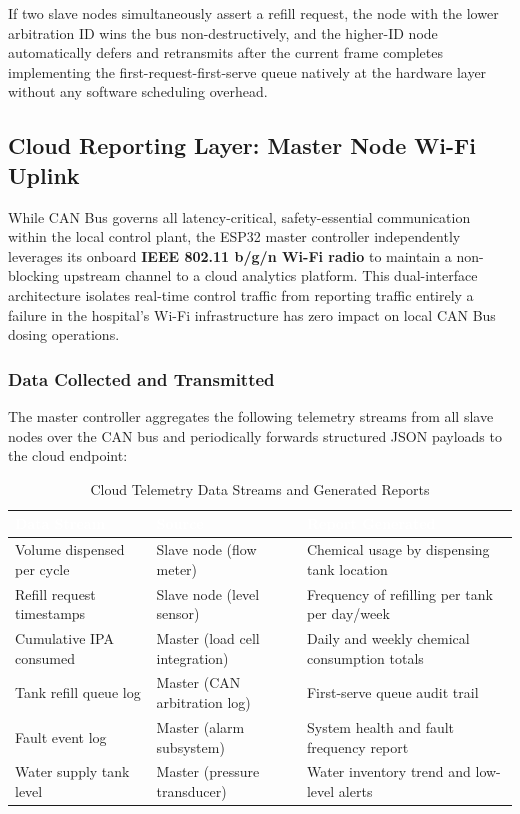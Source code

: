 \documentclass[12pt,a4paper]{article}
\begin{document}
If two slave nodes simultaneously assert a refill request, the node with the lower arbitration ID wins the bus non-destructively, and the higher-ID node automatically defers and retransmits after the current frame completes implementing the first-request-first-serve queue natively at the hardware layer without any software scheduling overhead.

\subsection{Cloud Reporting Layer: Master Node Wi-Fi Uplink}

While CAN Bus governs all latency-critical, safety-essential communication within the local control plant, the ESP32 master controller independently leverages its onboard \textbf{IEEE 802.11 b/g/n Wi-Fi radio} to maintain a non-blocking upstream channel to a cloud analytics platform. This dual-interface architecture isolates real-time control traffic from reporting traffic entirely a failure in the hospital's Wi-Fi infrastructure has zero impact on local CAN Bus dosing operations.

\subsubsection*{Data Collected and Transmitted}

The master controller aggregates the following telemetry streams from all slave nodes over the CAN bus and periodically forwards structured JSON payloads to the cloud endpoint:

\begin{table}[H]
\centering
\setlength{\tabcolsep}{5pt}
\renewcommand{\arraystretch}{1.4}
\begin{tabular}{|p{4.5cm}|p{4.5cm}|p{4.5cm}|}
\hline
\rowcolor{headerblue}
\textcolor{white}{\textbf{Data Stream}} &
\textcolor{white}{\textbf{Source}} &
\textcolor{white}{\textbf{Report Generated}} \\
\hline
Volume dispensed per cycle & Slave node (flow meter) & Chemical usage by dispensing tank location \\
\hline
\rowcolor{rowgray}
Refill request timestamps & Slave node (level sensor) & Frequency of refilling per tank per day/week \\
\hline
Cumulative IPA consumed & Master (load cell integration) & Daily and weekly chemical consumption totals \\
\hline
\rowcolor{rowgray}
Tank refill queue log & Master (CAN arbitration log) & First-serve queue audit trail \\
\hline
Fault event log & Master (alarm subsystem) & System health and fault frequency report \\
\hline
\rowcolor{rowgray}
Water supply tank level & Master (pressure transducer) & Water inventory trend and low-level alerts \\
\hline
\end{tabular}
\caption{Cloud Telemetry Data Streams and Generated Reports}
\end{table}
\end{document}
